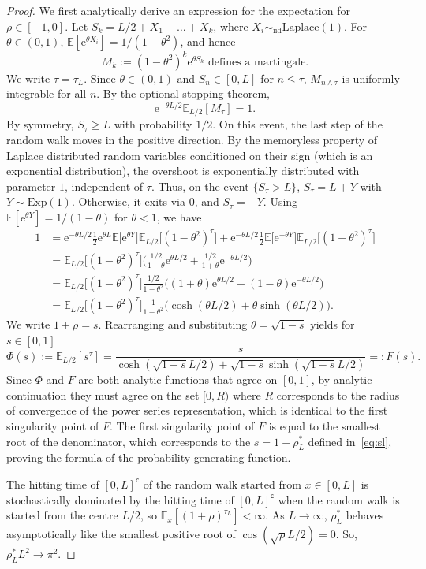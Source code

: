 \documentclass[a4paper, a4wide, 10pt, reqno]{amsart}
\theoremstyle{plain}
\theoremstyle{definition}
\numberwithin{equation}{section}
\newcommand{\E}{\mathbb E}
\newcommand{\re}{{\mathrm e}}
\renewcommand{\complement}{\mathsf{c}}
\begin{document}
\begin{proof}
  We first analytically derive an expression for the expectation for $\rho\in[-1,0]$.
Let $S_k=L/2+X_1+\ldots+X_k$, where $X_i\sim_\mathrm{iid} \mathrm{Laplace}(1)$. For $\theta\in (0,1)$, $\E[\re^{\theta X_i}]=1/(1-\theta^2)$, and hence 
\[
M_k:= (1-\theta^2)^k\re^{\theta S_k}\text{ defines a martingale}.
\]
We write $\tau=\tau_L$.
Since $\theta\in(0,1)$ and $S_n\in[0, L]$ for $n\le \tau$, $M_{n\wedge\tau}$ is uniformly integrable for all $n$. By the optional stopping theorem,
\[
\re^{-\theta L/2} \E_{L/2}[M_\tau]=1.
\]
By symmetry, $S_\tau\ge L$ with probability $1/2$. On this event, the last step of the random walk moves in the positive direction. By the memoryless property of Laplace distributed random variables conditioned on their sign (which is an exponential distribution), the overshoot is exponentially distributed with parameter $1$, independent of $\tau$. Thus, on the event $\{S_\tau> L\}$, $S_\tau=L+Y$ with $Y\sim\mathrm{Exp}(1)$. Otherwise, it exits via 0, and $S_\tau=-Y$. Using $\E[\re^{\theta Y}]=1/(1-\theta)$ for $\theta<1$,  we have
\[
\begin{aligned}
1 &= \re^{-\theta L/2} \frac{1}{2}\re^{\theta L}\E\big[\re^{\theta Y}\big]\E_{L/2}\big[(1-\theta^2)^\tau\big]+\re^{-\theta L/2} \frac{1}{2}\E\big[\re^{-\theta Y}\big]\E_{L/2}\big[(1-\theta^2)^\tau\big] \\ &= \E_{L/2}\big[(1-\theta^2)^\tau]\Big(\frac{1/2}{1-\theta}\re^{\theta L/2} + \frac{1/2}{1+\theta}\re^{-\theta L/2}\Big) \\
&= \E_{L/2}\big[(1-\theta^2)^\tau]\frac{1/2}{1-\theta^2}\Big((1+\theta)\re^{\theta L/2} + (1-\theta)\re^{-\theta L/2}\Big)\\&=\E_{L/2}\big[(1-\theta^2)^\tau\big]\frac{1}{1-\theta^2}\big(\cosh(\theta L/2) + \theta\sinh(\theta L/2)\big).
\end{aligned}
\]
We write $1+\rho=s$.
Rearranging and substituting $\theta=\sqrt{1-s}$ yields for $s\in [0,1]$
\[
\Phi(s):=\E_{L/2}[s^\tau] = \frac{s}{\cosh(\sqrt{1-s} L/2)+\sqrt{1-s} \sinh(\sqrt{1-s} L/2)}=:F(s).
\]
Since $\Phi$ and $F$ are both analytic functions that agree on $[0,1]$, by analytic continuation they must agree on the set $[0,R)$ where $R$ corresponds to the radius of convergence of the power series representation, which is identical to the first singularity point of $F$. The first singularity point of $F$ is equal to the smallest root of the denominator, which corresponds to the $s=1+\rho_L^*$ defined in~\eqref{eq:sl}, proving the formula of the probability generating function.\smallskip

The hitting time of $[0,L]^\complement$ of the random walk started from $x\in[0,L]$ is stochastically dominated by the hitting time of $[0,L]^\complement$ when the random walk is started from the centre $L/2$, so $
\E_x[(1+\rho)^{\tau_L}]<\infty$.
As $L\!\to\!\infty$, $\rho_L^*$ behaves asymptotically like the smallest positive root of $\cos(\sqrt{\rho}L/2)\!=\!0$. So, $\rho_L^*L^2\to \pi^2$. 
\end{proof}
\end{document}

